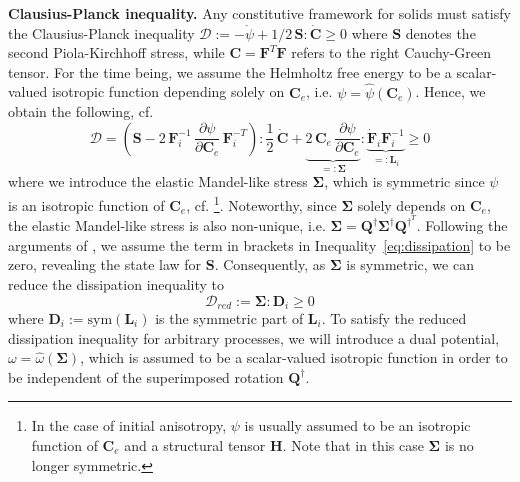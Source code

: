 \textbf{Clausius-Planck inequality.} Any constitutive framework for solids must satisfy the Clausius-Planck inequality $\mathcal{D} := -\dot{\psi} + 1/2\, \bm{S}:\dot{\bm{C}} \geq 0$ where $\bm{S}$ denotes the second Piola-Kirchhoff stress, while $\bm{C}=\bm{F}^T\bm{F}$ refers to the right Cauchy-Green tensor.
For the time being, we assume the Helmholtz free energy to be a scalar-valued isotropic function \cite{spencer1971,zheng1994} depending solely on $\bm{C}_e$, i.e. $\psi = \hat{\psi}(\bm{C}_e)$.
Hence, we obtain the following, cf. \cite{dettmer2004}
%
\begin{equation}
\mathcal{D} =    \left(\bm{S} - 2\,\bm{F}_i^{-1}\,\frac{\partial\psi}{\partial\bm{C}_e}\,\bm{F}_i^{-T} \right) : \frac{1}{2}\,\dot{\bm{C}} + \underbrace{2\,\bm{C}_e\,\frac{\partial\psi}{\partial\bm{C}_e}}_{=: \bm{\Sigma}} : \underbrace{\dot{\bm{F}}_i\bm{F}_i^{-1}}_{=: \bm{L}_i} \geq 0
\label{eq:dissipation}
\end{equation}
%
where we introduce the elastic Mandel-like stress $\bm{\Sigma}$, which is symmetric since $\psi$ is an isotropic function of $\bm{C}_e$, cf. \cite{svendsen2001}\footnote{In the case of initial anisotropy, $\psi$ is usually assumed to be an isotropic function of $\bm{C}_e$ and a structural tensor $\bm{H}$. Note that in this case $\bm{\Sigma}$ is no longer symmetric.}.
Noteworthy, since $\bm{\Sigma}$ solely depends on $\bm{C}_e$, the elastic Mandel-like stress is also non-unique, i.e. $\bm{\Sigma}=\bm{Q}^{\dagger}\bm{\Sigma}^\dagger\bm{Q}^{\dagger^T}$.
Following the arguments of \cite{coleman1961,coleman1963,coleman1967}, we assume the term in brackets in Inequality~\eqref{eq:dissipation} to be zero, revealing the state law for $\bm{S}$.
Consequently, as $\bm{\Sigma}$ is symmetric, we can reduce the dissipation inequality to
%
\begin{equation}
    \mathcal{D}_{red} := \bm{\Sigma} : \bm{D}_i \geq 0
    \label{eq:dissipation_red}
\end{equation}
%
where $\bm{D}_i := \mathrm{sym}(\bm{L}_i)$ is the symmetric part of $\bm{L}_i$.
To satisfy the reduced dissipation inequality for arbitrary processes, we will introduce a dual potential, $\omega=\hat{\omega}(\bm{\Sigma})$, which is assumed to be a scalar-valued isotropic function in order to be independent of the superimposed rotation $\bm{Q}^\dagger$.\newline

